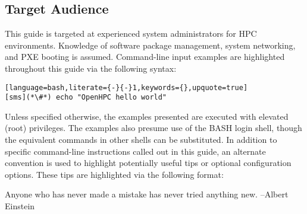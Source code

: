 \subsection{Target Audience}

This guide is targeted at experienced \Linux{} system administrators for HPC
environments. Knowledge of software package management, system networking, and
PXE booting is assumed. Command-line input examples are highlighted throughout
this guide via the following syntax:

\begin{lstlisting}[language=bash,literate={-}{-}1,keywords={},upquote=true]
[sms](*\#*) echo "OpenHPC hello world"
\end{lstlisting}

Unless specified otherwise, the examples presented are executed with
elevated (root) privileges. The examples also presume use of the BASH login
shell, though the equivalent commands in other shells can be substituted.
In addition to specific command-line instructions called out in this guide, an
alternate convention is used to highlight potentially useful tips or optional
configuration options. These tips are highlighted via the following format:

\begin{center}
\begin{tcolorbox}[]
\small
Anyone who has never made a mistake has never tried anything new. --Albert Einstein
\end{tcolorbox}
\end{center}

